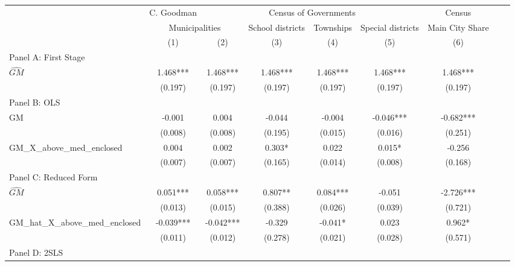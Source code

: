  \begin{tabular}{l*{8}{c}} \toprule
&\multicolumn{1}{c}{C. Goodman}&\multicolumn{4}{c}{Census of Governments}&\multicolumn{1}{c}{Census}\\\cmidrule(lr){2-2}\cmidrule(lr){3-6}\cmidrule(lr){7-7}
&\multicolumn{2}{c}{Municipalities}&\multicolumn{1}{c}{School districts}&\multicolumn{1}{c}{Townships}&\multicolumn{1}{c}{Special districts}&\multicolumn{1}{c}{Main City Share}\\\cmidrule(lr){2-3}\cmidrule(lr){4-6}\cmidrule(lr){7-7}
&\multicolumn{1}{c}{(1)}&\multicolumn{1}{c}{(2)}&\multicolumn{1}{c}{(3)}&\multicolumn{1}{c}{(4)}&\multicolumn{1}{c}{(5)}&\multicolumn{1}{c}{(6)}\\
\cmidrule(lr){1-7}
\multicolumn{6}{l}{Panel A: First Stage}\\
\cmidrule(lr){1-7}
$\widehat{GM}$  &    1.468***&    1.468***&    1.468***&    1.468***&    1.468***&    1.468***\\
                &  (0.197)   &  (0.197)   &  (0.197)   &  (0.197)   &  (0.197)   &  (0.197)   \\
\cmidrule(lr){1-7}
\multicolumn{6}{l}{Panel B: OLS}\\
\cmidrule(lr){1-7}
GM              &   -0.001   &    0.004   &   -0.044   &   -0.004   &   -0.046***&   -0.682***\\
                &  (0.008)   &  (0.008)   &  (0.195)   &  (0.015)   &  (0.016)   &  (0.251)   \\
\addlinespace
GM\_X\_above\_med\_enclosed&    0.004   &    0.002   &    0.303*  &    0.022   &    0.015*  &   -0.256   \\
                &  (0.007)   &  (0.007)   &  (0.165)   &  (0.014)   &  (0.008)   &  (0.168)   \\
\cmidrule(lr){1-7}
\multicolumn{6}{l}{Panel C: Reduced Form}\\
\cmidrule(lr){1-7}
$\widehat{GM}$  &    0.051***&    0.058***&    0.807** &    0.084***&   -0.051   &   -2.726***\\
                &  (0.013)   &  (0.015)   &  (0.388)   &  (0.026)   &  (0.039)   &  (0.721)   \\
\addlinespace
GM\_hat\_X\_above\_med\_enclosed&   -0.039***&   -0.042***&   -0.329   &   -0.041*  &    0.023   &    0.962*  \\
                &  (0.011)   &  (0.012)   &  (0.278)   &  (0.021)   &  (0.028)   &  (0.571)   \\
\cmidrule(lr){1-7}
\multicolumn{6}{l}{Panel D: 2SLS}\\

\end{tabular}
